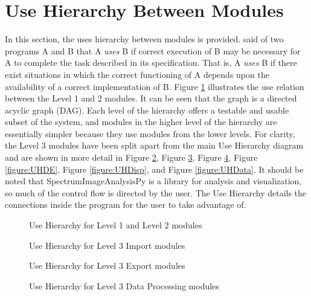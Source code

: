 \documentclass[12pt, titlepage]{article}
\newcommand{\progname}{SpectrumImageAnalysisPy}
\begin{document}
\section{Use Hierarchy Between Modules} \label{SecUse}

In this section, the uses hierarchy between modules is provided.
\cite{Parnas1978} said of two programs A and B that A {\em uses} B if correct
execution of B may be necessary for A to complete the task described in its
specification. That is, A {\em uses} B if there exist situations in which the
correct functioning of A depends upon the availability of a correct
implementation of B.  Figure \ref{figure:UH} illustrates the use relation
between the Level 1 and 2 modules. It can be seen that the graph is a directed
acyclic graph (DAG). Each level of the hierarchy offers a testable and usable
subset of the system, and modules in the higher level of the hierarchy are
essentially simpler because they use modules from the lower levels. For clarity,
the Level 3 modules have been split apart from the main Use Hierarchy diagram
and are shown in more detail in Figure \ref{figure:UHIm}, Figure
\ref{figure:UHEx}, Figure \ref{figure:UHDP}, Figure \ref{figure:UHDE}, Figure
\ref{figure:UHDisp}, and Figure \ref{figure:UHData}. It should be noted that
\progname{} is a library for analysis and visualization, so much of the control
flow is directed by the user. The Use Hierarchy details the connections inside
the program for the user to take advantage of.

\begin{figure}[h!]
	\centering
	
	\caption{Use Hierarchy for Level 1 and Level 2 modules}
	\label{figure:UH}
\end{figure}

\begin{figure}[h!]
	\centering
	
	\caption{Use Hierarchy for Level 3 Import modules}
	\label{figure:UHIm}
\end{figure}

\begin{figure}[h!]
	\centering
	
	\caption{Use Hierarchy for Level 3 Export modules}
	\label{figure:UHEx}
\end{figure}

\begin{figure}[h!]
	\centering
	
	\caption{Use Hierarchy for Level 3 Data Processing modules}
	\label{figure:UHDP}
\end{figure}
\end{document}
